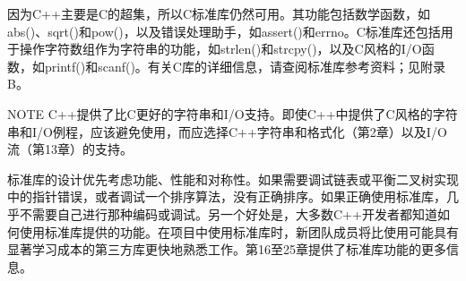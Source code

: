 
因为C++主要是C的超集，所以C标准库仍然可用。其功能包括数学函数，如abs()、sqrt()和pow()，以及错误处理助手，如assert()和errno。C标准库还包括用于操作字符数组作为字符串的功能，如strlen()和strcpy()，以及C风格的I/O函数，如printf()和scanf()。有关C库的详细信息，请查阅标准库参考资料；见附录B。

\begin{myNotic}{NOTE}
C++提供了比C更好的字符串和I/O支持。即使C++中提供了C风格的字符串和I/O例程，应该避免使用，而应选择C++字符串和格式化（第2章）以及I/O流（第13章）的支持。
\end{myNotic}


标准库的设计优先考虑功能、性能和对称性。如果需要调试链表或平衡二叉树实现中的指针错误，或者调试一个排序算法，没有正确排序。如果正确使用标准库，几乎不需要自己进行那种编码或调试。另一个好处是，大多数C++开发者都知道如何使用标准库提供的功能。在项目中使用标准库时，新团队成员将比使用可能具有显著学习成本的第三方库更快地熟悉工作。第16至25章提供了标准库功能的更多信息。









